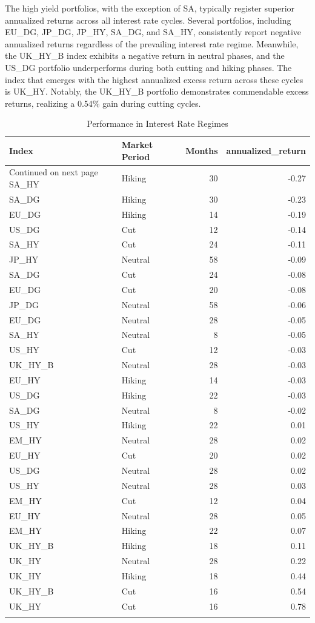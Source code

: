 \documentclass[11pt,preprint, authoryear]{elsarticle}
\numberwithin{equation}{section}
\numberwithin{figure}{section}
\numberwithin{table}{section}
\begin{document}
The high yield portfolios, with the exception of SA, typically register
superior annualized returns across all interest rate cycles. Several
portfolios, including EU\_DG, JP\_DG, JP\_HY, SA\_DG, and SA\_HY,
consistently report negative annualized returns regardless of the
prevailing interest rate regime. Meanwhile, the UK\_HY\_B index exhibits
a negative return in neutral phases, and the US\_DG portfolio
underperforms during both cutting and hiking phases. The index that
emerges with the highest annualized excess return across these cycles is
UK\_HY. Notably, the UK\_HY\_B portfolio demonstrates commendable excess
returns, realizing a 0.54\% gain during cutting cycles.

\begingroup\fontsize{12pt}{13pt}\selectfont
\begin{longtable}{llrr}
  \toprule
Index & Market Period & Months & annualized\_return \\ 
  \hline 
\endhead 
\hline 
{\footnotesize Continued on next page} 
\endfoot 
\endlastfoot 
 \midrule
SA\_HY & Hiking &  30 & -0.27 \\ 
  SA\_DG & Hiking &  30 & -0.23 \\ 
  EU\_DG & Hiking &  14 & -0.19 \\ 
  US\_DG & Cut &  12 & -0.14 \\ 
  SA\_HY & Cut &  24 & -0.11 \\ 
  JP\_HY & Neutral &  58 & -0.09 \\ 
  SA\_DG & Cut &  24 & -0.08 \\ 
  EU\_DG & Cut &  20 & -0.08 \\ 
  JP\_DG & Neutral &  58 & -0.06 \\ 
  EU\_DG & Neutral &  28 & -0.05 \\ 
  SA\_HY & Neutral &   8 & -0.05 \\ 
  US\_HY & Cut &  12 & -0.03 \\ 
  UK\_HY\_B & Neutral &  28 & -0.03 \\ 
  EU\_HY & Hiking &  14 & -0.03 \\ 
  US\_DG & Hiking &  22 & -0.03 \\ 
  SA\_DG & Neutral &   8 & -0.02 \\ 
  US\_HY & Hiking &  22 & 0.01 \\ 
  EM\_HY & Neutral &  28 & 0.02 \\ 
  EU\_HY & Cut &  20 & 0.02 \\ 
  US\_DG & Neutral &  28 & 0.02 \\ 
  US\_HY & Neutral &  28 & 0.03 \\ 
  EM\_HY & Cut &  12 & 0.04 \\ 
  EU\_HY & Neutral &  28 & 0.05 \\ 
  EM\_HY & Hiking &  22 & 0.07 \\ 
  UK\_HY\_B & Hiking &  18 & 0.11 \\ 
  UK\_HY & Neutral &  28 & 0.22 \\ 
  UK\_HY & Hiking &  18 & 0.44 \\ 
  UK\_HY\_B & Cut &  16 & 0.54 \\ 
  UK\_HY & Cut &  16 & 0.78 \\ 
   \bottomrule
\caption{Performance in Interest Rate Regimes\label{tab3}} 
\end{longtable}
\endgroup
\end{document}
